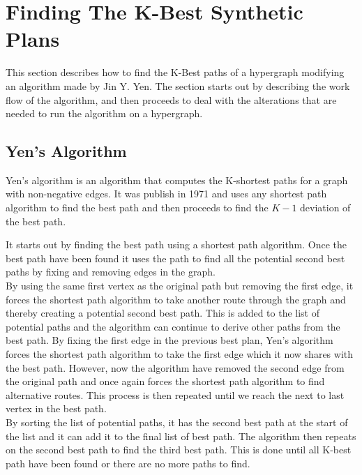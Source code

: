 \documentclass[a4paper,10pt,titlepage]{paper}
\begin{document}
\section{Finding The K-Best Synthetic Plans}
This section describes how to find the K-Best paths of a hypergraph modifying an algorithm made by Jin Y. Yen. The section starts out by describing the work flow of the algorithm, and then proceeds to deal with the alterations that are needed to run the algorithm on a hypergraph.
\subsection{Yen's Algorithm}
Yen's algorithm is an algorithm that computes the K-shortest paths for a graph with non-negative edges. It was publish in 1971 and uses any shortest path algorithm to find the best path and then proceeds to find the $K-1$ deviation of the best path. \cite{Yen}

It starts out by finding the best path using a shortest path algorithm. Once the best path have been found it uses the path to find all the potential second best paths by fixing and removing edges in the graph. \\
By using the same first vertex as the original path but removing the first edge, it forces the shortest path algorithm to take another route through the graph and thereby creating a potential second best path. This is added to the list of potential paths and the algorithm can continue to derive other paths from the best path. By fixing the first edge in the previous best plan, Yen's algorithm forces the shortest path algorithm to take the first edge which it now shares with the best path. However, now the algorithm have removed the second edge from the original path and once again forces the shortest path algorithm to find alternative routes. This process is then repeated until we reach the next to last vertex in the best path.\\
By sorting the list of potential paths, it has the second best path at the start of the list and it can add it to the final list of best path. The algorithm then repeats on the second best path to find the third best path. This is done until all K-best path have been found or there are no more paths to find.
\end{document}
